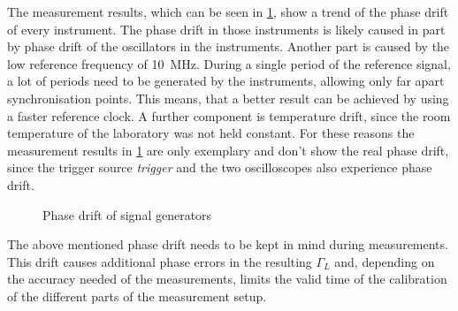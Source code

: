 \documentclass[12pt,a4paper,parskip=full,abstract=true,BCOR=12mm,twoside,open=right]{scrreprt}
\def\device#1{\textit{#1}}
\begin{document}
The measurement results, which can be seen in \cref{fig:phase_overall}, show a
trend of the phase drift of every instrument. The phase drift in those instruments is likely
caused in part by phase drift of the oscillators in the instruments. Another part is caused by
the low reference frequency of \SI{10}{\mega\hertz}. During a single period of the reference
signal, a lot of periods need to be generated by the instruments, allowing only far apart
synchronisation points. This means, that a better result can be achieved by using a faster
reference clock. A further component is temperature drift, since the room temperature
of the laboratory was not held constant. For these reasons the measurement results in
\cref{fig:phase_overall} are only exemplary and don't show the real phase drift, since
the trigger source \device{trigger} and the two oscilloscopes also experience phase drift.

\begin{figure}[htb]
    \centering
    \caption{Phase drift of signal generators}
    \label{fig:phase_overall}
\end{figure}

The above mentioned phase drift needs to be kept in mind during measurements. This
drift causes additional phase errors in the resulting $\Gamma_L$ and, depending on
the accuracy needed of the measurements, limits the valid time of the calibration of
the different parts of the measurement setup.
\end{document}
